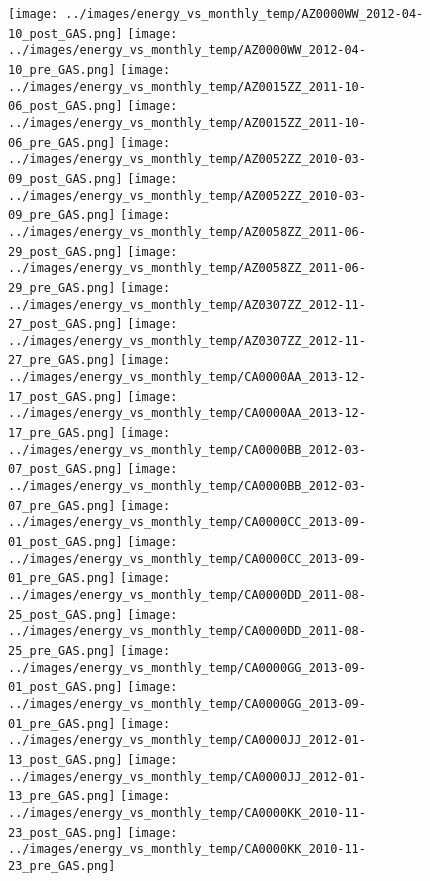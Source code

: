 \clearpage
\begin{figure}
\centering
\texttt{[image: ../images/energy\_vs\_monthly\_temp/AZ0000WW\_2012-04-10\_post\_GAS.png]}
\texttt{[image: ../images/energy\_vs\_monthly\_temp/AZ0000WW\_2012-04-10\_pre\_GAS.png]}
\texttt{[image: ../images/energy\_vs\_monthly\_temp/AZ0015ZZ\_2011-10-06\_post\_GAS.png]}
\texttt{[image: ../images/energy\_vs\_monthly\_temp/AZ0015ZZ\_2011-10-06\_pre\_GAS.png]}
\texttt{[image: ../images/energy\_vs\_monthly\_temp/AZ0052ZZ\_2010-03-09\_post\_GAS.png]}
\texttt{[image: ../images/energy\_vs\_monthly\_temp/AZ0052ZZ\_2010-03-09\_pre\_GAS.png]}
\texttt{[image: ../images/energy\_vs\_monthly\_temp/AZ0058ZZ\_2011-06-29\_post\_GAS.png]}
\texttt{[image: ../images/energy\_vs\_monthly\_temp/AZ0058ZZ\_2011-06-29\_pre\_GAS.png]}
\texttt{[image: ../images/energy\_vs\_monthly\_temp/AZ0307ZZ\_2012-11-27\_post\_GAS.png]}
\texttt{[image: ../images/energy\_vs\_monthly\_temp/AZ0307ZZ\_2012-11-27\_pre\_GAS.png]}
\texttt{[image: ../images/energy\_vs\_monthly\_temp/CA0000AA\_2013-12-17\_post\_GAS.png]}
\texttt{[image: ../images/energy\_vs\_monthly\_temp/CA0000AA\_2013-12-17\_pre\_GAS.png]}
\texttt{[image: ../images/energy\_vs\_monthly\_temp/CA0000BB\_2012-03-07\_post\_GAS.png]}
\texttt{[image: ../images/energy\_vs\_monthly\_temp/CA0000BB\_2012-03-07\_pre\_GAS.png]}
\texttt{[image: ../images/energy\_vs\_monthly\_temp/CA0000CC\_2013-09-01\_post\_GAS.png]}
\texttt{[image: ../images/energy\_vs\_monthly\_temp/CA0000CC\_2013-09-01\_pre\_GAS.png]}
\texttt{[image: ../images/energy\_vs\_monthly\_temp/CA0000DD\_2011-08-25\_post\_GAS.png]}
\texttt{[image: ../images/energy\_vs\_monthly\_temp/CA0000DD\_2011-08-25\_pre\_GAS.png]}
\texttt{[image: ../images/energy\_vs\_monthly\_temp/CA0000GG\_2013-09-01\_post\_GAS.png]}
\texttt{[image: ../images/energy\_vs\_monthly\_temp/CA0000GG\_2013-09-01\_pre\_GAS.png]}
\texttt{[image: ../images/energy\_vs\_monthly\_temp/CA0000JJ\_2012-01-13\_post\_GAS.png]}
\texttt{[image: ../images/energy\_vs\_monthly\_temp/CA0000JJ\_2012-01-13\_pre\_GAS.png]}
\texttt{[image: ../images/energy\_vs\_monthly\_temp/CA0000KK\_2010-11-23\_post\_GAS.png]}
\texttt{[image: ../images/energy\_vs\_monthly\_temp/CA0000KK\_2010-11-23\_pre\_GAS.png]}
\end{figure}
